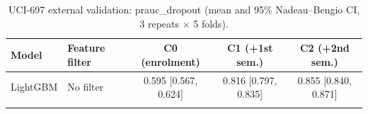 \begin{table}[t]
\centering
\small
\caption{UCI-697 external validation: prauc\_dropout (mean and 95\% Nadeau--Bengio CI, 3 repeats $\times$ 5 folds).}
\label{tab:uci697_prauc_dropout}
\begin{tabular}{llccc}
\toprule
Model & Feature filter & C0 (enrolment) & C1 (+1st sem.) & C2 (+2nd sem.) \\
\midrule
LightGBM & No filter & 0.595 [0.567, 0.624] & 0.816 [0.797, 0.835] & 0.855 [0.840, 0.871] \\
\addlinespace
\bottomrule
\end{tabular}
\end{table}